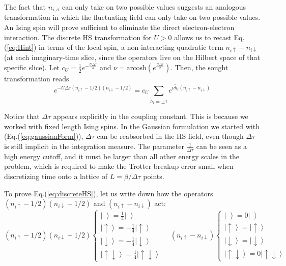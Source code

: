 The fact that $n_{i,\sigma}$ can only take on two possible values suggests an analogous transformation in which the fluctuating field can only take on two possible values.
An Ising spin will prove sufficient to eliminate the direct electron-electron interaction.
The discrete HS transformation for $U > 0$ allows us to recast Eq.(\ref{eq:Hint}) in terms of the local spin, a non-interacting quadratic term $n_{i\uparrow} - n_{i\downarrow} $ (at each imaginary-time slice, since the operators live on the Hilbert space of that specific slice).
Let $c_U = \frac{1}{2} e^{-\frac{U\Delta \tau}{4}}$ and $\nu = \text{arcosh} ( e^{\frac{U\Delta\tau}{2}})$.
Then, the sought transformation reads
\begin{equation}\label{eq:discreteHS}
e^{-U \Delta\tau (n_{i\uparrow} - 1/2 ) (n_{i\downarrow} - 1/2 )} = c_U \sum_{\widetilde{h}_i = \pm 1} e^{\nu \widetilde{h}_i (n_{i\uparrow} - n_{i\downarrow} )}
\end{equation}

Notice that $\Delta \tau$ appears explicitly in the coupling constant.
This is because we worked with fixed length Ising spins.
In the Gaussian formulation we started with (Eq.(\ref{eq:gaussianForm})), $\Delta \tau$ can be reabsorbed in the HS field, even though $\Delta \tau$ is still implicit in the integration measure.
The parameter $\frac{1}{\Delta \tau}$ can be seen as a high energy cutoff, and it must be larger than all other energy scales in the problem, which is required to make the Trotter breakup error small when discretizing time onto a lattice of $L = \beta / \Delta \tau$ points.

To prove Eq.(\ref{eq:discreteHS}), let us write down how the operators  $(n_{i\uparrow} - 1/2 ) (n_{i\downarrow} - 1/2 )$ and $(n_{i\uparrow} - n_{i\downarrow} )$ act:
\begin{equation}
(n_{i\uparrow} - 1/2 ) (n_{i\downarrow} - 1/2 )
\begin{cases}
\left| \, \, \right\rangle = \frac{1}{4} \left| \, \, \right\rangle \\
\left| \uparrow \right\rangle = -\frac{1}{4} \left| \uparrow \right\rangle \\
\left| \downarrow \right\rangle = -\frac{1}{4} \left| \downarrow \right\rangle \\
\left| \uparrow \downarrow \right\rangle = \frac{1}{4} \left| \uparrow \downarrow \right\rangle
\end{cases} \quad
(n_{i\uparrow} - n_{i\downarrow} )
\begin{cases}
\left| \, \, \right\rangle = 0\left| \, \, \right\rangle \\
\left| \uparrow \right\rangle = \left| \uparrow \right\rangle \\
\left| \downarrow \right\rangle = \left| \downarrow \right\rangle \\
\left| \uparrow \downarrow \right\rangle = 0 \left| \uparrow \downarrow \right\rangle
\end{cases}
\end{equation}

